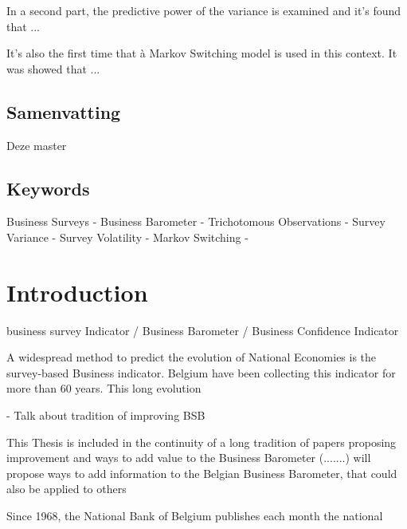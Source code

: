 \documentclass[12pt,a4paper,oneside]{book}
\begin{document}
In a second part, the predictive power of the variance is examined and it's found that ...

It's also the first time that à Markov Switching model is used in this context. It was showed that ...


\section*{Samenvatting}

Deze master


\section*{Keywords}
Business Surveys - 
Business Barometer -
Trichotomous Observations -
Survey Variance - 
Survey Volatility -
Markov Switching - 

\tableofcontents

\newpage
\setcounter{page}{0}


\chapter{Introduction}

business survey Indicator / Business Barometer / Business Confidence Indicator

A widespread method to predict the evolution of National Economies is the survey-based Business indicator. Belgium have been collecting this indicator for more than 60 years. This long evolution 

- Talk about tradition of improving BSB

This Thesis is included in the continuity of a long tradition of papers proposing improvement and ways to add value to the Business Barometer (.......) will propose ways to add information to the Belgian Business Barometer, that could also be applied to others

Since 1968, the National Bank of Belgium publishes each month the national 



\end{document}
